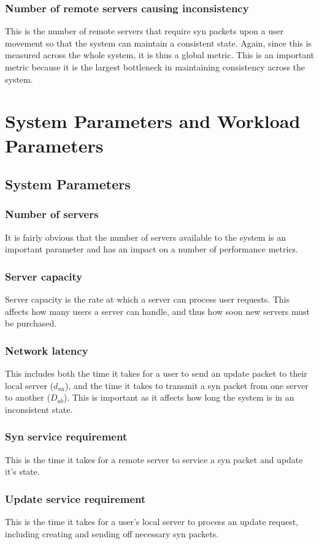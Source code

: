 \documentclass[12pt]{article}
\begin{document}
    \subsubsection{Number of remote servers causing inconsistency}
This is the number of remote servers that require syn packets upon a user
movement so that the system can maintain a consistent state.  Again, since this
is measured across the whole system, it is thus a global metric.  This is an
important metric because it is the largest bottleneck in maintaining consistency
across the system.
\section{System Parameters and Workload Parameters}
  \subsection{System Parameters}
    \subsubsection{Number of servers}
It is fairly obvious that the number of servers available to the system is an
important parameter and has an impact on a number of performance metrics.
    \subsubsection{Server capacity}
Server capacity is the rate at which a server can process user requests.  This
affects how many users a server can handle, and thus how soon new servers must
be purchased.
    \subsubsection{Network latency}
This includes both the time it takes for a user to send an update packet to
their local server ($d_{au}$), and the time it takes to transmit a syn packet
from one server to another ($D_{ab}$).  This is important as it affects how long
the system is in an inconsistent state.
    \subsubsection{Syn service requirement}
This is the time it takes for a remote server to service a syn packet and update
it's state.
    \subsubsection{Update service requirement}
This is the time it takes for a user's local server to process an update
request, including creating and sending off necessary syn packets.
\end{document}
